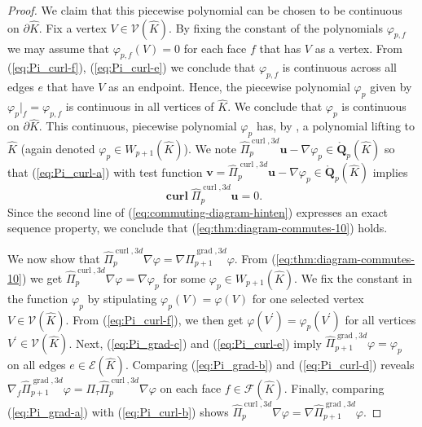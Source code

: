 \documentclass{article}
\newcommand{\hatPicurlcom}{\widehat \Pi^{\operatorname*{curl},3d}_p}
\newcommand{\hatPigradcom}{\widehat\Pi^{\operatorname*{grad},3d}_{p+1}}
\begin{document}
\begin{proof}
We claim that this piecewise polynomial can be chosen to be continuous on
$\partial\widehat{K}$. Fix a vertex $V\in{\mathcal{V}}(\widehat{K})$. By
fixing the constant of the polynomials $\varphi_{p,f}$ we may assume that
$\varphi_{p,f}(V)=0$ for each face $f$ that has $V$ as a vertex. From
(\ref{eq:Pi_curl-f}), (\ref{eq:Pi_curl-e}) we conclude that $\varphi_{p,f}$ is
continuous across all edges $e$ that have $V$ as an endpoint. Hence, the
piecewise polynomial $\varphi_{p}$ given by $\varphi_{p}|_{f}=\varphi_{p,f}$
is continuous in all vertices of $\widehat{K}$. We conclude that $\varphi_{p}$
is continuous on $\partial\widehat{K}$. This continuous, piecewise polynomial
$\varphi_{p}$ has, by \cite{munoz-sola97,demkowicz-gopalakrishnan-schoeberl-I}, a polynomial lifting to
$\widehat{K}$ (again denoted $\varphi_{p}\in W_{p+1}(\widehat{K})$). We note
$
\hatPicurlcom\mathbf{u}-\nabla\varphi_{p}%
\in\mathring{\mathbf{Q}}_{p}(\widehat{K})
$
so that (\ref{eq:Pi_curl-a}) with test function $\mathbf{v}=\hatPicurlcom\mathbf{u}-\nabla\varphi_{p}\in\mathring{\mathbf{Q}}_{p}(\widehat{K})$ implies%
\begin{equation}
\operatorname*{\mathbf{curl}}\hatPicurlcom\mathbf{u}=0.
\label{eq:thm:diagram-commutes-50}%
\end{equation}
Since the second line of (\ref{eq:commuting-diagram-hinten}) expresses an
exact sequence property, we conclude that (\ref{eq:thm:diagram-commutes-10}) holds.

We now show that $\hatPicurlcom\nabla
\varphi=\nabla\hatPigradcom\varphi$. From
(\ref{eq:thm:diagram-commutes-10}) we get $\hatPicurlcom\nabla\varphi=\nabla\varphi_{p}$ for some
$\varphi_{p}\in W_{p+1}(\widehat{K})$. We fix the constant in the function
$\varphi_{p}$ by stipulating $\varphi_{p}(V)=\varphi(V)$ for one selected
vertex $V\in{\mathcal{V}}(\widehat{K})$. From (\ref{eq:Pi_curl-f}), we then
get $\varphi(V^{\prime})=\varphi_{p}(V^{\prime})$ for all vertices $V^{\prime
}\in{\mathcal{V}}(\widehat{K})$. Next, (\ref{eq:Pi_grad-c}) and
(\ref{eq:Pi_curl-e}) imply $\hatPigradcom%
\varphi=\varphi_{p}$ on all edges $e\in{\mathcal{E}}(\widehat{K})$. Comparing
(\ref{eq:Pi_grad-b}) and (\ref{eq:Pi_curl-d}) reveals $\nabla_{f}\hatPigradcom\varphi=\Pi_{\tau}\hatPicurlcom\nabla\varphi$ on each face $f\in{\mathcal{F}%
}(\widehat{K})$. Finally, comparing (\ref{eq:Pi_grad-a}) with
(\ref{eq:Pi_curl-b}) shows $\hatPicurlcom%
\nabla\varphi=\nabla\hatPigradcom\varphi$.


\end{proof}
\end{document}
